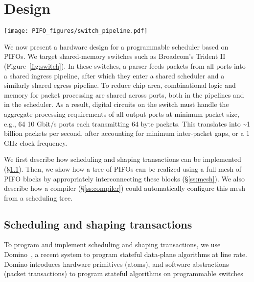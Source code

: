 \section{Design}
\label{s:design}

\begin{figure*}
  \centering
  \texttt{[image: PIFO\_figures/switch\_pipeline.pdf]}
  \caption{A 64-port shared memory switch.  Combinational logic and memory are
  shared across ports, both in the pipelines and in the scheduler. The switch
  runs at a clock frequency of 1 GHz.}
  \label{fig:switch}
\end{figure*}

We now present a hardware design for a programmable scheduler based on PIFOs.
We target shared-memory switches such as Broadcom's Trident II~\cite{trident2}
(Figure~\ref{fig:switch}). In these switches, a parser feeds packets from all
ports into a shared ingress pipeline, after which they enter a shared scheduler
and a similarly shared egress pipeline. To reduce chip area, combinational
logic and memory for packet processing are shared across ports, both in the
pipelines and in the scheduler.  As a result, digital circuits on the switch
must handle the aggregate processing requirements of all output ports at
minimum packet size, e.g., 64 10 Gbit/s ports each transmitting 64 byte
packets. This translates into \textasciitilde 1 billion packets per second,
after accounting for minimum inter-packet gaps, or a 1 GHz clock
frequency.

We first describe how scheduling and shaping transactions can be implemented
(\S\ref{ss:transactions}). Then, we show how a tree of PIFOs can be realized
using a full mesh of PIFO blocks by appropriately interconnecting these blocks
(\S\ref{ss:mesh}). We also describe how a compiler (\S\ref{ss:compiler}) could
automatically configure this mesh from a scheduling tree.

\subsection{Scheduling and shaping transactions}
\label{ss:transactions}

To program and implement scheduling and shaping transactions, we use
Domino~\cite{domino_sigcomm}, a recent system to program stateful
data-plane algorithms at line rate. Domino introduces hardware
primitives (atoms), and software abstractions (packet transactions) to
program stateful algorithms on programmable switches~\cite{tofino, flexpipe,
xpliant, rmt}


